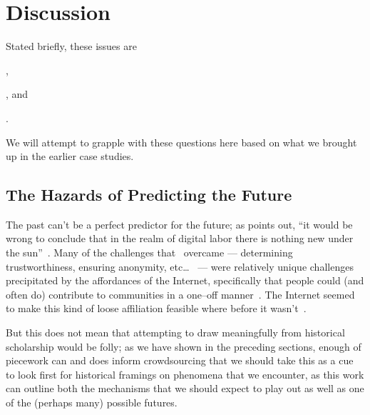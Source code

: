 \documentclass[trackingWork]{subfiles}
\begin{document}
\section{Discussion}
Stated briefly, these issues are 
\begin{inlinelist}
  \item {},
  \item {}, and
  \item {}.
\end{inlinelist}
We will attempt to grapple with these questions here based on
what we brought up in the earlier case studies.


\subsection{The Hazards of Predicting the Future}\label{sec:perilousProblemsPredicting}
The past can't be a perfect predictor for the future;
as \cite{scholz2012digital} points out,
``it would be wrong to conclude that
in the realm of digital labor
there is nothing new under the sun''~\cite{scholz2012digital}.
Many of the challenges that \DO~overcame
--- determining trustworthiness, ensuring anonymity, etc\dots~\cite{dynamo} ---
were relatively unique challenges precipitated by the affordances of the Internet, specifically
that people could (and often do) contribute to communities in a one--off manner~\cite{mcinnis2016one}.
The Internet seemed to make this kind of loose affiliation feasible where before it wasn't~\cite{catalyst,dynamo}.


But this does not mean that
attempting to draw meaningfully from historical scholarship would be folly;
as we have shown in the preceding sections,
enough of piecework can and does inform crowdsourcing that
we should take this as a cue to look first for
historical framings on phenomena that we encounter,
as this work can outline both the mechanisms that we should expect to play out
as well as one of the (perhaps many) possible futures.
\end{document}
